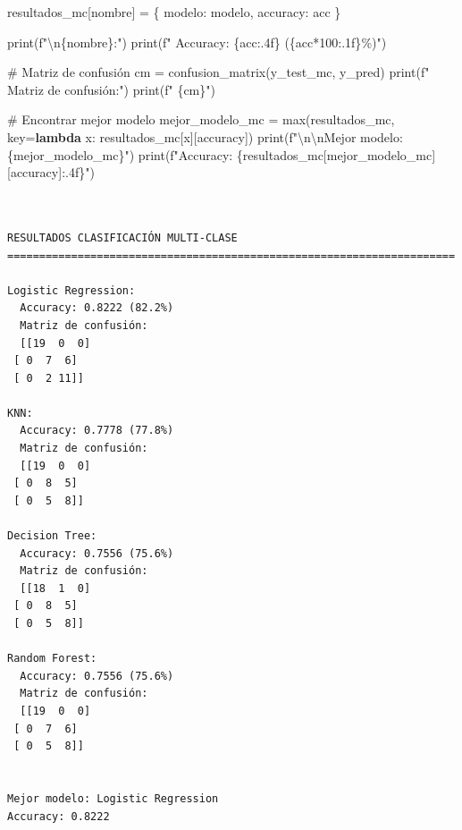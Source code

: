 \documentclass[
  doc,
  floatsintext,
  longtable,
  a4paper,
  nolmodern,
  notxfonts,
  notimes,
  12pt,
  colorlinks=true,linkcolor=blue,citecolor=blue,urlcolor=blue]{apa7}
\newenvironment{Shaded}{\begin{snugshade}}{\end{snugshade}}
\newcommand{\BuiltInTok}[1]{\textcolor[rgb]{0.00,0.23,0.31}{#1}}
\newcommand{\CharTok}[1]{\textcolor[rgb]{0.13,0.47,0.30}{#1}}
\newcommand{\CommentTok}[1]{\textcolor[rgb]{0.37,0.37,0.37}{#1}}
\newcommand{\DecValTok}[1]{\textcolor[rgb]{0.68,0.00,0.00}{#1}}
\newcommand{\KeywordTok}[1]{\textcolor[rgb]{0.00,0.23,0.31}{\textbf{#1}}}
\newcommand{\NormalTok}[1]{\textcolor[rgb]{0.00,0.23,0.31}{#1}}
\newcommand{\OperatorTok}[1]{\textcolor[rgb]{0.37,0.37,0.37}{#1}}
\newcommand{\SpecialCharTok}[1]{\textcolor[rgb]{0.37,0.37,0.37}{#1}}
\newcommand{\SpecialStringTok}[1]{\textcolor[rgb]{0.13,0.47,0.30}{#1}}
\newcommand{\StringTok}[1]{\textcolor[rgb]{0.13,0.47,0.30}{#1}}
\begin{document}
\begin{Shaded}
\begin{Highlighting}[]
\NormalTok{    resultados\_mc[nombre] }\OperatorTok{=}\NormalTok{ \{}
        \StringTok{\textquotesingle{}modelo\textquotesingle{}}\NormalTok{: modelo,}
        \StringTok{\textquotesingle{}accuracy\textquotesingle{}}\NormalTok{: acc}
\NormalTok{    \}}
    
    \BuiltInTok{print}\NormalTok{(}\SpecialStringTok{f"}\CharTok{\textbackslash{}n}\SpecialCharTok{\{}\NormalTok{nombre}\SpecialCharTok{\}}\SpecialStringTok{:"}\NormalTok{)}
    \BuiltInTok{print}\NormalTok{(}\SpecialStringTok{f"  Accuracy: }\SpecialCharTok{\{}\NormalTok{acc}\SpecialCharTok{:.4f\}}\SpecialStringTok{ (}\SpecialCharTok{\{}\NormalTok{acc}\OperatorTok{*}\DecValTok{100}\SpecialCharTok{:.1f\}}\SpecialStringTok{\%)"}\NormalTok{)}
    
    \CommentTok{\# Matriz de confusión}
\NormalTok{    cm }\OperatorTok{=}\NormalTok{ confusion\_matrix(y\_test\_mc, y\_pred)}
    \BuiltInTok{print}\NormalTok{(}\SpecialStringTok{f"  Matriz de confusión:"}\NormalTok{)}
    \BuiltInTok{print}\NormalTok{(}\SpecialStringTok{f"  }\SpecialCharTok{\{}\NormalTok{cm}\SpecialCharTok{\}}\SpecialStringTok{"}\NormalTok{)}

\CommentTok{\# Encontrar mejor modelo}
\NormalTok{mejor\_modelo\_mc }\OperatorTok{=} \BuiltInTok{max}\NormalTok{(resultados\_mc, key}\OperatorTok{=}\KeywordTok{lambda}\NormalTok{ x: resultados\_mc[x][}\StringTok{\textquotesingle{}accuracy\textquotesingle{}}\NormalTok{])}
\BuiltInTok{print}\NormalTok{(}\SpecialStringTok{f"}\CharTok{\textbackslash{}n\textbackslash{}n}\SpecialStringTok{Mejor modelo: }\SpecialCharTok{\{}\NormalTok{mejor\_modelo\_mc}\SpecialCharTok{\}}\SpecialStringTok{"}\NormalTok{)}
\BuiltInTok{print}\NormalTok{(}\SpecialStringTok{f"Accuracy: }\SpecialCharTok{\{}\NormalTok{resultados\_mc[mejor\_modelo\_mc][}\StringTok{\textquotesingle{}accuracy\textquotesingle{}}\NormalTok{]}\SpecialCharTok{:.4f\}}\SpecialStringTok{"}\NormalTok{)}
\end{Highlighting}
\end{Shaded}

\begin{verbatim}


RESULTADOS CLASIFICACIÓN MULTI-CLASE
======================================================================

Logistic Regression:
  Accuracy: 0.8222 (82.2%)
  Matriz de confusión:
  [[19  0  0]
 [ 0  7  6]
 [ 0  2 11]]

KNN:
  Accuracy: 0.7778 (77.8%)
  Matriz de confusión:
  [[19  0  0]
 [ 0  8  5]
 [ 0  5  8]]

Decision Tree:
  Accuracy: 0.7556 (75.6%)
  Matriz de confusión:
  [[18  1  0]
 [ 0  8  5]
 [ 0  5  8]]

Random Forest:
  Accuracy: 0.7556 (75.6%)
  Matriz de confusión:
  [[19  0  0]
 [ 0  7  6]
 [ 0  5  8]]


Mejor modelo: Logistic Regression
Accuracy: 0.8222
\end{verbatim}
\end{document}
